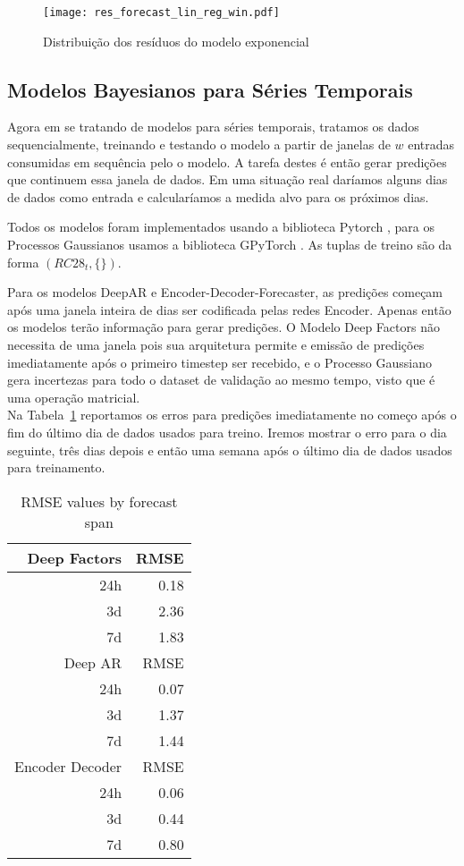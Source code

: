 \begin{figure}[H]
  \label{fig:res_exp}
  \centering
  \texttt{[image: res\_forecast\_lin\_reg\_win.pdf]} \hfill
  \caption{Distribuição dos resíduos do modelo exponencial} 
\end{figure}

\subsection{Modelos Bayesianos para Séries Temporais}


Agora em se tratando de modelos para séries temporais, tratamos os dados
sequencialmente, treinando e testando o modelo a partir de janelas de $w$
entradas consumidas em sequência pelo o modelo. A tarefa destes é então gerar
predições que continuem essa janela de dados. Em uma situação real daríamos
alguns dias de dados como entrada e calcularíamos a medida alvo para os próximos dias. 

Todos os modelos foram implementados usando a biblioteca Pytorch \cite{pytorch}, para os Processos Gaussianos usamos a biblioteca GPyTorch \cite{gpytorch}. As tuplas de treino são da forma $(RC28_{t},\{\})$. 

Para os modelos DeepAR e Encoder-Decoder-Forecaster, as predições começam após
uma janela inteira de dias ser codificada pelas redes Encoder.
Apenas então os modelos terão informação para gerar predições. O Modelo Deep
Factors não necessita de uma janela pois sua arquitetura permite e emissão de
predições imediatamente após o primeiro timestep ser recebido,
e o Processo Gaussiano gera incertezas para todo o dataset de validação ao mesmo tempo, visto que é uma operação matricial. \\

Na Tabela~\ref{tb:rmse} reportamos os erros para predições imediatamente no
começo após o fim do último dia de dados usados para treino. Iremos mostrar o
erro para o dia seguinte, três dias depois e então uma semana após o último dia
de dados usados para treinamento.

\begin{center}
\begin{table}[htbp]
\caption{RMSE values by forecast span}
\centering
\begin{tabular}{rr}
\hline
Deep Factors & RMSE\\
\hline
24h & 0.18\\
3d & 2.36\\
7d & 1.83\\
\hline
Deep AR & RMSE\\
\hline
24h & 0.07\\
3d & 1.37\\
7d & 1.44\\
\hline
Encoder Decoder & RMSE\\
\hline
24h & 0.06\\
3d & 0.44\\
7d & 0.80\\
\end{tabular}

\label{tb:rmse}
\end{table}
\end{center}

